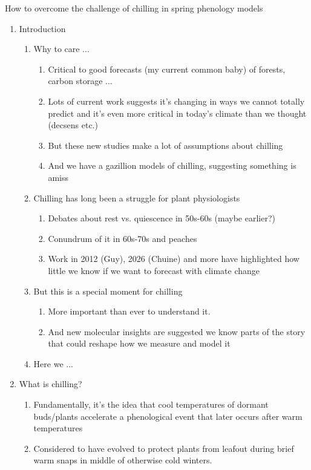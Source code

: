 \documentclass[11pt,letter]{article}
\begin{document}
{\sc How to overcome the challenge of chilling in spring phenology models} %
\begin{enumerate}
\item Introduction
\begin{enumerate}
\item Why to care ...
\begin{enumerate}
\item Critical to good forecasts (my current common baby) of forests, carbon storage ...
\item Lots of current work suggests it's changing in ways we cannot totally predict and it's even more critical in today's climate than we thought (decsens etc.)
\item But these new studies make a lot of assumptions about chilling 
\item And we have a gazillion models of chilling, suggesting something is amiss
\end{enumerate}
\item Chilling has long been a struggle for plant physiologists
\begin{enumerate}
\item Debates about rest vs. quiescence in 50s-60s (maybe earlier?)
\item Conundrum of it in 60s-70s and peaches
\item Work in 2012 (Guy), 2026 (Chuine) and more have highlighted how little we know if we want to forecast with climate change
\end{enumerate}
\item But this is a special moment for chilling
\begin{enumerate}
\item More important than ever to understand it.
\item And new molecular insights are suggested we know parts of the story that could reshape how we measure and model it
\end{enumerate}
\item Here we ...
\end{enumerate}
\item What is chilling?
\begin{enumerate}
\item Fundamentally, it's the idea that cool temperatures of dormant buds/plants accelerate a phenological event that later occurs after warm temperatures
\item Considered to have evolved to protect plants from leafout during brief warm snaps in middle of otherwise cold winters. 

\end{enumerate}
\end{enumerate}
\end{document}
